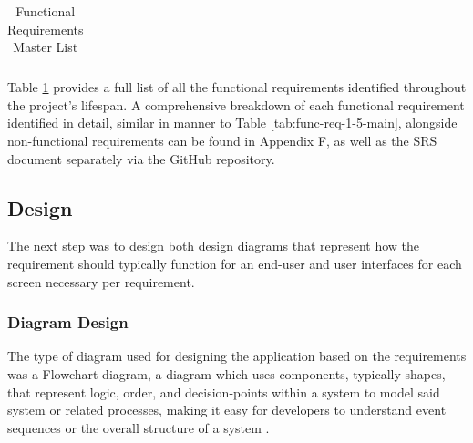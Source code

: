 \documentclass[12pt]{article}
\begin{document}
\begin{table}[H]
{\begin{tabular}{@{}l|ll@{}}
\end{tabular}%
}
\caption{Functional Requirements Master List}
\label{tab:func-req-master-list}
\end{table}


Table \ref{tab:func-req-master-list} provides a full list of all the functional requirements identified throughout the project's lifespan. A comprehensive breakdown of each functional  requirement identified in detail, 
similar in manner to Table \ref{tab:func-req-1-5-main}, alongside non-functional requirements can be found in Appendix F, as well as the SRS document separately via the GitHub repository.


\newpage

\subsection{Design}

The next step was to design both design diagrams that represent how the requirement should typically function for an  end-user and user interfaces for each screen necessary per requirement. 


\subsubsection{Diagram Design}

The type of diagram used for designing the application based on the requirements was a Flowchart diagram, a diagram which uses components, typically shapes, that represent logic, order, and decision-points within a system
to model said system or related processes, making it easy for developers to understand event sequences or the overall structure of a system \autocite{RefWorks:RefID:166-ghritlahare2025role}.
\end{document}
